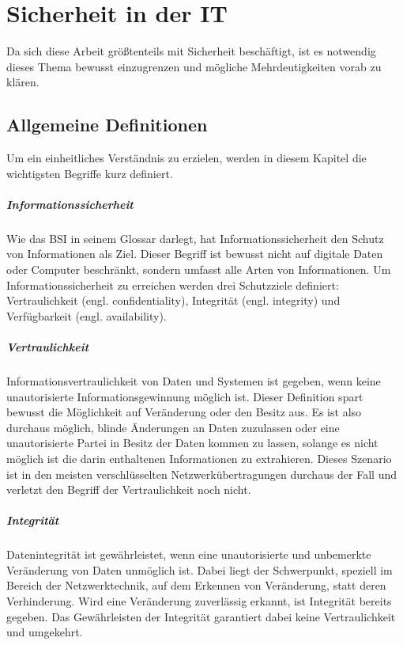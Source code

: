 \chapter{Sicherheit in der IT}
\label{chap:itsecurity}
Da sich diese Arbeit größtenteils mit Sicherheit beschäftigt, ist es notwendig dieses Thema bewusst einzugrenzen und mögliche Mehrdeutigkeiten vorab zu klären.

\section{Allgemeine Definitionen}
Um ein einheitliches Verständnis zu erzielen, werden in diesem Kapitel die wichtigsten Begriffe kurz definiert.

\paragraph{Informationssicherheit}
Wie das \ac{BSI} in seinem Glossar darlegt, hat Informationssicherheit den Schutz von Informationen als Ziel\cite{BSIGlossar}. Dieser Begriff ist bewusst nicht auf digitale Daten oder Computer beschränkt, sondern umfasst alle Arten von Informationen. Um Informationssicherheit zu erreichen werden drei Schutzziele definiert: Vertraulichkeit (engl. confidentiality), Integrität (engl. integrity) und Verfügbarkeit (engl. availability).

\paragraph{Vertraulichkeit}
Informationsvertraulichkeit von Daten und Systemen ist gegeben, wenn keine unautorisierte Informationsgewinnung möglich ist\cite[p. 10]{Eckert2013}. Dieser Definition spart bewusst die Möglichkeit auf Veränderung oder den Besitz aus. Es ist also durchaus möglich, blinde Änderungen an Daten zuzulassen oder eine unautorisierte Partei in Besitz der Daten kommen zu lassen, solange es nicht möglich ist die darin enthaltenen Informationen zu extrahieren. Dieses Szenario ist in den meisten verschlüsselten Netzwerkübertragungen durchaus der Fall und verletzt den Begriff der Vertraulichkeit noch nicht.    

\paragraph{Integrität}
Datenintegrität ist gewährleistet, wenn eine unautorisierte und unbemerkte Veränderung von Daten unmöglich ist\cite[p. 9]{Eckert2013}. Dabei liegt der Schwerpunkt, speziell im Bereich der Netzwerktechnik, auf dem Erkennen von Veränderung, statt deren Verhinderung. Wird eine Veränderung zuverlässig erkannt, ist Integrität bereits gegeben. Das Gewährleisten der Integrität garantiert dabei keine Vertraulichkeit und umgekehrt.

